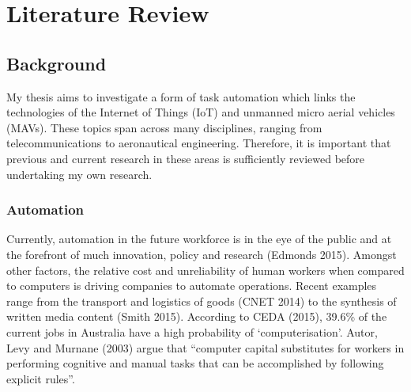 
\chapter{Literature Review} %

\label{Chapter1} %


\section{Background}

My thesis aims to investigate a form of task automation which links the technologies of the Internet of Things (IoT) and unmanned micro aerial vehicles (MAVs). These topics span across many disciplines, ranging from telecommunications to aeronautical engineering. Therefore, it is important that previous and current research in these areas is sufficiently reviewed before undertaking my own research.

\subsection{Automation}

Currently, automation in the future workforce is in the eye of the public and at the forefront of much innovation, policy and research (Edmonds 2015). Amongst other factors, the relative cost and unreliability of human workers when compared to computers is driving companies to automate operations. Recent examples range from the transport and logistics of goods (CNET 2014) to the synthesis of written media content (Smith 2015). According to CEDA (2015), 39.6\% of the current jobs in Australia have a high probability of ‘computerisation’. Autor, Levy and Murnane (2003) argue that “computer capital substitutes for workers in performing cognitive and manual tasks that can be accomplished by following explicit rules”.


